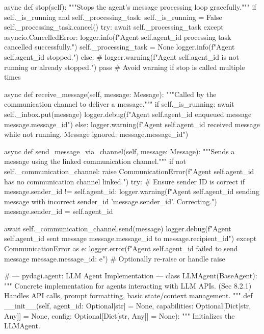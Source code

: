 \documentclass{amsbook}
\theoremstyle{definition}
\theoremstyle{remark}
\numberwithin{equation}{chapter} %
\begin{document}
\begin{python}
    async def stop(self):
        """Stops the agent's message processing loop gracefully."""
        if self._is_running and self._processing_task:
            self._is_running = False
            self._processing_task.cancel()
            try:
                await self._processing_task
            except asyncio.CancelledError:
                logger.info(f"Agent {self.agent_id} processing task cancelled successfully.")
            self._processing_task = None
            logger.info(f"Agent {self.agent_id} stopped.")
        else:
            # logger.warning(f"Agent {self.agent_id} is not running or already stopped.")
            pass # Avoid warning if stop is called multiple times

    async def receive_message(self, message: Message):
        """Called by the communication channel to deliver a message."""
        if self._is_running:
            await self._inbox.put(message)
            logger.debug(f"Agent {self.agent_id} enqueued message {message.message_id}")
        else:
            logger.warning(f"Agent {self.agent_id} received message while not running. Message ignored: {message.message_id}")

    async def send_message_via_channel(self, message: Message):
        """Sends a message using the linked communication channel."""
        if not self._communication_channel:
            raise CommunicationError(f"Agent {self.agent_id} has no communication channel linked.")
        try:
             # Ensure sender ID is correct
             if message.sender_id != self.agent_id:
                  logger.warning(f"Agent {self.agent_id} sending message with incorrect sender_id '{message.sender_id}'. Correcting.")
                  message.sender_id = self.agent_id

             await self._communication_channel.send(message)
             logger.debug(f"Agent {self.agent_id} sent message {message.message_id} to {message.recipient_id}")
        except CommunicationError as e:
            logger.error(f"Agent {self.agent_id} failed to send message {message.message_id}: {e}")
            # Optionally re-raise or handle
            raise

# --- pydagi.agent: LLM Agent Implementation ---
class LLMAgent(BaseAgent):
    """
    Concrete implementation for agents interacting with LLM APIs. (Sec 8.2.1)
    Handles API calls, prompt formatting, basic state/context management.
    """
    def __init__(self, agent_id: Optional[str] = None, capabilities: Optional[Dict[str, Any]] = None, config: Optional[Dict[str, Any]] = None):
        """
        Initializes the LLMAgent.


\end{python}
\end{document}
